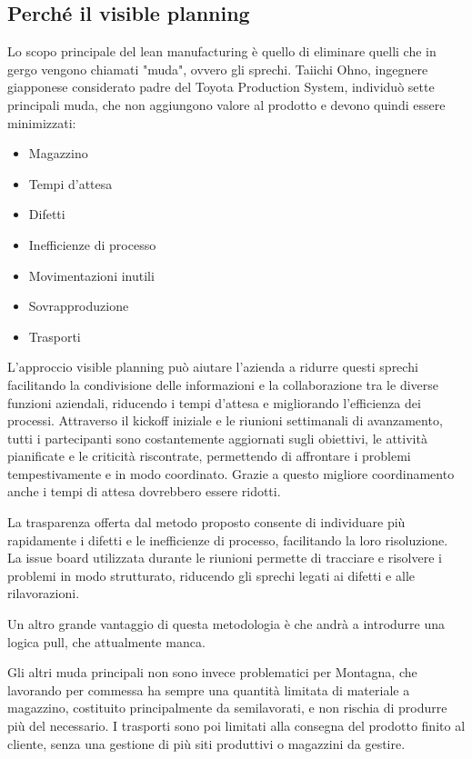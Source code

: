 \begin{multicols}{2}
\subsection{Perché il visible planning}
	Lo scopo principale del lean manufacturing è quello di eliminare quelli che in gergo vengono chiamati "muda", ovvero gli sprechi.
	Taiichi Ohno, ingegnere giapponese considerato padre del Toyota Production System, individuò sette principali muda, che non aggiungono valore al prodotto e devono quindi essere minimizzati:
	\begin{itemize}
		\item Magazzino
		\item Tempi d'attesa
		\item Difetti
		\item Inefficienze di processo
		\item Movimentazioni inutili
		\item Sovrapproduzione
		\item Trasporti
	\end{itemize}

	L'approccio visible planning  può aiutare l'azienda a ridurre questi sprechi facilitando la condivisione delle informazioni e la collaborazione tra le diverse funzioni aziendali, riducendo i tempi d'attesa e migliorando l'efficienza dei processi.
	Attraverso il kickoff iniziale e le riunioni settimanali di avanzamento, tutti i partecipanti sono costantemente aggiornati sugli obiettivi, le attività pianificate e le criticità riscontrate, permettendo di affrontare i problemi tempestivamente e in modo coordinato.
	Grazie a questo migliore coordinamento anche i tempi di attesa dovrebbero essere ridotti.

	La trasparenza offerta dal metodo proposto consente di individuare più rapidamente i difetti e le inefficienze di processo, facilitando la loro risoluzione. La issue board utilizzata durante le riunioni permette di tracciare e risolvere i problemi in modo strutturato, riducendo gli sprechi legati ai difetti e alle rilavorazioni.

	Un altro grande vantaggio di questa metodologia è che andrà a introdurre una logica pull, che attualmente manca.

	Gli altri muda principali non sono invece problematici per Montagna, che lavorando per commessa ha sempre una quantità limitata di materiale a magazzino, costituito principalmente da semilavorati, e non rischia di produrre più del necessario.
	I trasporti sono poi limitati alla consegna del prodotto finito al cliente, senza una gestione di più siti produttivi o magazzini da gestire.

\end{multicols}
